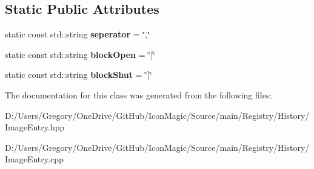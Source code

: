\subsection*{Static Public Attributes}
\begin{DoxyCompactItemize}
\item 
\hypertarget{class_image_entry_ad4a7cf6088ced1381d05d3f1fcb7ba92}{}static const std\+::string {\bfseries seperator} = \char`\"{},\char`\"{}\label{class_image_entry_ad4a7cf6088ced1381d05d3f1fcb7ba92}

\item 
\hypertarget{class_image_entry_aad3911ab2c1a76a434c649344ed00394}{}static const std\+::string {\bfseries block\+Open} = \char`\"{}\mbox{[}\char`\"{}\label{class_image_entry_aad3911ab2c1a76a434c649344ed00394}

\item 
\hypertarget{class_image_entry_a3b9e7171180470a60857f679fe34dc58}{}static const std\+::string {\bfseries block\+Shut} = \char`\"{}\mbox{]}\char`\"{}\label{class_image_entry_a3b9e7171180470a60857f679fe34dc58}

\end{DoxyCompactItemize}


The documentation for this class was generated from the following files\+:\begin{DoxyCompactItemize}
\item 
D\+:/\+Users/\+Gregory/\+One\+Drive/\+Git\+Hub/\+Icon\+Magic/\+Source/main/\+Registry/\+History/Image\+Entry.\+hpp\item 
D\+:/\+Users/\+Gregory/\+One\+Drive/\+Git\+Hub/\+Icon\+Magic/\+Source/main/\+Registry/\+History/Image\+Entry.\+cpp\end{DoxyCompactItemize}
